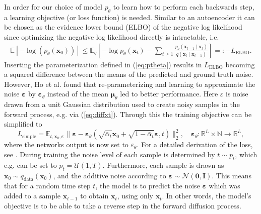 \documentclass{report}
\begin{document}
In order for our choice of model $p_{\theta}$ to learn how to perform each backwards step, a learning objective (or loss function) is needed. Similar to an autoencoder \cite{goodfellow2016deep} it can be chosen as the evidence lower bound (ELBO) of the negative log likelihood since optimizing the negative log likelihood directly is intractable, i.e.
\begin{align}
\label{vlb1}
    \mathbb{E}[-\log(p_\theta(\bm{x}_0))] \leq \mathbb{E}_q \left[ -\log p_\theta(\bm{x}_t) - \sum_{t\geq 1} \frac{p_\theta(\bm{x}_{t-1}\mid\bm{x}_t)}{q(\bm{x}_t\mid\bm{x}_{t-1})} \right] =: -L_{\text{ELBO}}.
\end{align}
Inserting the parameterization defined in (\ref{eq:ptheta}) results in $L_{\text{ELBO}}$ becoming a squared difference between the means of the predicted and ground truth noise. However, Ho et al. \cite{ho2020denoising} found that re-parameterizing and learning to approximate the noise $\bm{\varepsilon}$ by $\bm{\varepsilon}_\theta$ instead of the mean $\bm{\mu}_\theta$ led to better performance. Here $\varepsilon$ is noise drawn from a unit Gaussian distribution used to create noisy samples in the forward process, e.g. via (\ref{eq:diffxt}). Through this the training objective can be simplified to
\begin{equation} \label{eq:trainsimple}
    L_{\text{simple}} = \mathbb{E}_{t, \bm{x}_0, \bm{\varepsilon}} \|\bm{\varepsilon} - \bm{\varepsilon}_\theta(\sqrt{\bar{\alpha}_t} \bm{x}_0 + \sqrt{1-\bar{\alpha}_t} \bm{\varepsilon}, t)\|^2_2, \quad \bm{\varepsilon}_{\theta}: \mathbb{R}^{L}\times \mathbb{N} \rightarrow \mathbb{R}^{L},
\end{equation}
where the networks output is now set to $\varepsilon_{\theta}$. For a detailed derivation of the loss, see \cite{kong2020diffwave}. During training the noise level of each sample is determined by $t \sim p_t$, which e.g. can be set to $p_t = \mathcal{U}(1, T)$. Furthermore, each sample is drawn as $\bm{x}_0 \sim q_{\text{data}}(\bm{x}_0)$, and the additive noise according to $\bm{\varepsilon} \sim \mathcal{N}(\bm{0}, \bm{I})$. This means that for a random time step $t$, the model is to predict the noise $\bm{\varepsilon}$ which was added to a sample $\bm{x}_{t-1}$ to obtain $\bm{x}_t$, using only $\bm{x}_t$. In other words, the model's objective is to be able to take a reverse step in the forward diffusion process.

\end{document}
